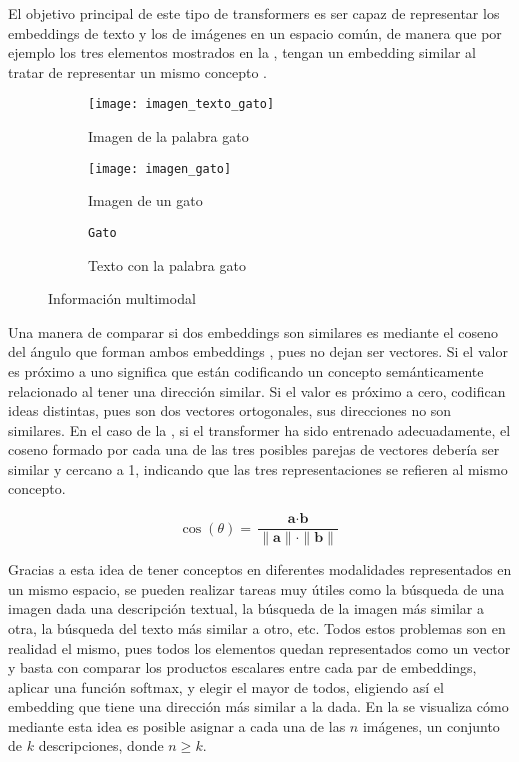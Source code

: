 			El objetivo principal de este tipo de transformers es ser capaz de representar los embeddings de texto y los de imágenes en un espacio común, de manera que por ejemplo los tres elementos mostrados en la , tengan un embedding similar al tratar de representar un mismo concepto \cite{multimodal_transformers}.
			
			\begin{figure}[!h]
				\centering
				\begin{subfigure}{.3\textwidth}
					\centering
					\texttt{[image: imagen\_texto\_gato]}
					\caption{Imagen de la palabra gato}
				\end{subfigure}\hfill
				\begin{subfigure}{.3\textwidth}
					\centering
					\texttt{[image: imagen\_gato]}
					\caption{Imagen de un gato}
				\end{subfigure}
				\begin{subfigure}{.3\textwidth}
					\centering
					\Large\texttt{Gato}
					\caption{Texto con la palabra gato}
				\end{subfigure}
				\caption{Información multimodal}
				\label{fig:info_multi}
			\end{figure} 
			
			Una manera de comparar si dos embeddings son similares es mediante el coseno del ángulo que forman ambos embeddings \cite{cosine}, pues no dejan ser vectores. Si el valor es próximo a uno significa que están codificando un concepto semánticamente relacionado al tener una dirección similar. Si el valor es próximo a cero, codifican ideas distintas, pues son dos vectores ortogonales, sus direcciones no son similares. En el caso de la , si el transformer ha sido entrenado adecuadamente, el coseno formado por cada una de las tres posibles parejas de vectores debería ser similar y cercano a 1, indicando que las tres representaciones se refieren al mismo concepto. 
			
			$$
			\cos(\theta) = \frac{\textbf{a} \cdot \textbf{b}}{\|\textbf{a}\|\cdot\|\textbf{b}\|}
			$$
			
			Gracias a esta idea de tener conceptos en diferentes modalidades representados en un mismo espacio, se pueden realizar tareas muy útiles como la búsqueda de una imagen dada una descripción textual, la búsqueda de la imagen más similar a otra, la búsqueda del texto más similar a otro, etc. Todos estos problemas son en realidad el mismo, pues todos los elementos quedan representados como un vector y basta con comparar los productos escalares entre cada par de embeddings, aplicar una función softmax, y elegir el mayor de todos, eligiendo así el embedding que tiene una dirección más similar a la dada. En la  \cite{clip} se visualiza cómo mediante esta idea es posible asignar a cada una de las $n$ imágenes, un conjunto de $k$ descripciones, donde $n \geq k$. 
			
